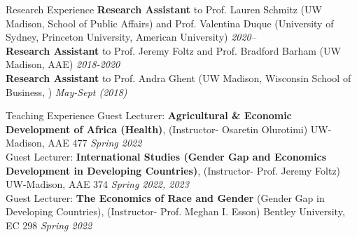 \documentclass{resume} %
\begin{document}
\begin{rSection}{Research Experience}
\textbf{Research Assistant} to Prof. Lauren Schmitz (UW Madison, School of Public Affairs) and Prof. Valentina Duque (University of Sydney, Princeton University, American University) \hfill \textit{2020--} \\
\textbf{Research Assistant} to Prof. Jeremy Foltz and Prof. Bradford Barham (UW Madison, AAE) \hfill \textit{2018-2020} \\
\textbf{Research Assistant} to Prof. Andra Ghent (UW Madison, Wisconsin School of Business, ) \hfill \textit{May-Sept (2018)}
\end{rSection}


\begin{rSection}{Teaching Experience}
Guest Lecturer: \textbf{Agricultural \& Economic Development of Africa (Health)}, (Instructor- Osaretin Olurotimi) UW-Madison, AAE 477
 \hfill \textit{Spring 2022} \\
Guest Lecturer: \textbf{International Studies (Gender Gap and Economics Development in Developing Countries)}, (Instructor- Prof. Jeremy Foltz) UW-Madison, AAE 374
 \hfill \textit{Spring 2022, 2023} \\
Guest Lecturer: \textbf{The Economics of Race and Gender} (Gender Gap in Developing Countries), (Instructor- Prof. Meghan I. Esson) Bentley University, EC 298
 \hfill \textit{Spring 2022}
\end{rSection}
\end{document}
